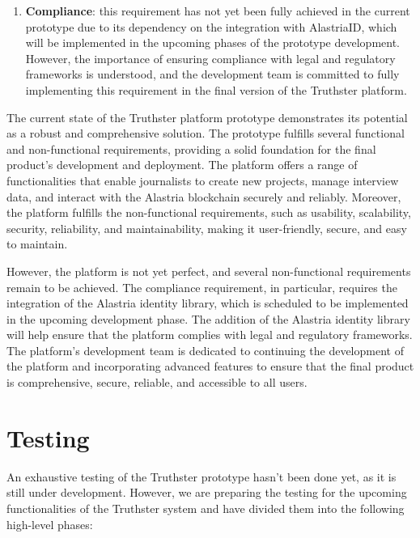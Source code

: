 \documentclass[target=mst,aauheader=]{thud}
\begin{document}
\begin{enumerate}
        \item \textbf{Compliance}: this requirement has not yet been fully achieved in the current prototype due to its dependency on the integration with AlastriaID, which will be implemented in the upcoming phases of the prototype development. However, the importance of ensuring compliance with legal and regulatory frameworks is understood, and the development team is committed to fully implementing this requirement in the final version of the Truthster platform.
    
    \end{enumerate}


The current state of the Truthster platform prototype demonstrates its potential as a robust and comprehensive solution. The prototype fulfills several functional and non-functional requirements, providing a solid foundation for the final product's development and deployment. The platform offers a range of functionalities that enable journalists to create new projects, manage interview data, and interact with the Alastria blockchain securely and reliably. Moreover, the platform fulfills the non-functional requirements, such as usability, scalability, security, reliability, and maintainability, making it user-friendly, secure, and easy to maintain.\par
However, the platform is not yet perfect, and several non-functional requirements remain to be achieved. The compliance requirement, in particular, requires the integration of the Alastria identity library, which is scheduled to be implemented in the upcoming development phase. The addition of the Alastria identity library will help ensure that the platform complies with legal and regulatory frameworks. The platform's development team is dedicated to continuing the development of the platform and incorporating advanced features to ensure that the final product is comprehensive, secure, reliable, and accessible to all users.

\section{Testing}

An exhaustive testing of the Truthster prototype hasn't been done yet, as it is still under development. However, we are preparing the testing for the upcoming functionalities of the Truthster system and have divided them into the following high-level phases:
\end{document}
